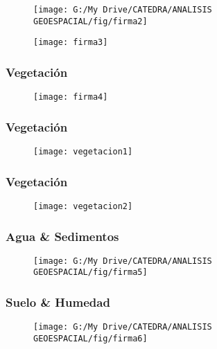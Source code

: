\documentclass[]{beamer}
\begin{document}
\begin{frame}
  \begin{figure}
    \centering
    \texttt{[image: G:/My Drive/CATEDRA/ANALISIS GEOESPACIAL/fig/firma2]}
  \end{figure}
\end{frame}
\begin{frame}
  \begin{figure}
    \centering
    \texttt{[image: firma3]}
  \end{figure}
\end{frame}
\begin{frame}
\frametitle{Vegetación}
  \begin{figure}
    \centering
    \texttt{[image: firma4]}
  \end{figure}
\end{frame}
\begin{frame}
\frametitle{Vegetación}
  \begin{figure}
    \centering
    \texttt{[image: vegetacion1]}
  \end{figure}
\end{frame}
\begin{frame}
\frametitle{Vegetación}
  \begin{figure}
    \centering
    \texttt{[image: vegetacion2]}
  \end{figure}
\end{frame}
\begin{frame}
\frametitle{Agua \& Sedimentos}
  \begin{figure}
    \centering
    \texttt{[image: G:/My Drive/CATEDRA/ANALISIS GEOESPACIAL/fig/firma5]}
  \end{figure}
\end{frame}
\begin{frame}
\frametitle{Suelo \& Humedad}
  \begin{figure}
    \centering
    \texttt{[image: G:/My Drive/CATEDRA/ANALISIS GEOESPACIAL/fig/firma6]}
  \end{figure}
\end{frame}
\end{document}
